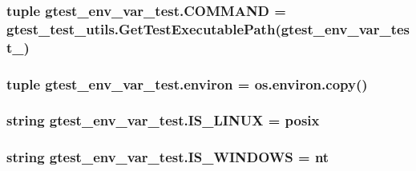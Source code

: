 \subsubsection[{C\+O\+M\+M\+A\+N\+D}]{\setlength{\rightskip}{0pt plus 5cm}tuple gtest\+\_\+env\+\_\+var\+\_\+test.\+C\+O\+M\+M\+A\+N\+D = {\bf gtest\+\_\+test\+\_\+utils.\+Get\+Test\+Executable\+Path}(\textquotesingle{}gtest\+\_\+env\+\_\+var\+\_\+test\+\_\+\textquotesingle{})}\label{namespacegtest__env__var__test_a6c739e8ac3f4f184d9351af775d26496}
\hypertarget{namespacegtest__env__var__test_a5cfdb73835d2006b40151861d9fd1e7c}{}
\subsubsection[{environ}]{\setlength{\rightskip}{0pt plus 5cm}tuple gtest\+\_\+env\+\_\+var\+\_\+test.\+environ = os.\+environ.\+copy()}\label{namespacegtest__env__var__test_a5cfdb73835d2006b40151861d9fd1e7c}
\hypertarget{namespacegtest__env__var__test_a33b1e2e9afe9d59d75503de4a1297486}{}
\subsubsection[{I\+S\+\_\+\+L\+I\+N\+U\+X}]{\setlength{\rightskip}{0pt plus 5cm}string gtest\+\_\+env\+\_\+var\+\_\+test.\+I\+S\+\_\+\+L\+I\+N\+U\+X = \textquotesingle{}posix\textquotesingle{}}\label{namespacegtest__env__var__test_a33b1e2e9afe9d59d75503de4a1297486}
\hypertarget{namespacegtest__env__var__test_af792d1403a09d46bffcd3466821cd0fb}{}
\subsubsection[{I\+S\+\_\+\+W\+I\+N\+D\+O\+W\+S}]{\setlength{\rightskip}{0pt plus 5cm}string gtest\+\_\+env\+\_\+var\+\_\+test.\+I\+S\+\_\+\+W\+I\+N\+D\+O\+W\+S = \textquotesingle{}nt\textquotesingle{}}\label{namespacegtest__env__var__test_af792d1403a09d46bffcd3466821cd0fb}
